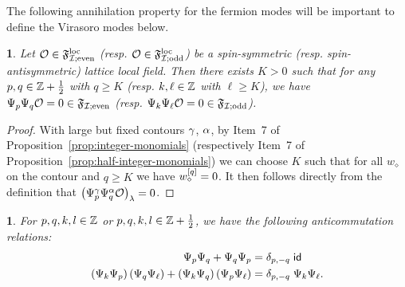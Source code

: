 \documentclass[12pt,oneside,english]{amsart}
\numberwithin{equation}{section}
\numberwithin{figure}{section}
\theoremstyle{plain}
\theoremstyle{plain}
\theoremstyle{plain}
\newtheorem{prop}[thm]{\protect\propositionname}
\theoremstyle{plain}
\newtheorem{lem}[thm]{\protect\lemmaname}
\theoremstyle{remark}
\theoremstyle{definition}
\theoremstyle{plain}
\theoremstyle{plain}
\numberwithin{thm}{section}
\providecommand{\lemmaname}{Lemma}
\providecommand{\propositionname}{Proposition}
\providecommand{\lemmaname}{Lemma}
\providecommand{\propositionname}{Proposition}
\providecommand{\lemmaname}{Lemma}
\providecommand{\propositionname}{Proposition}
\providecommand{\lemmaname}{Lemma}
\providecommand{\propositionname}{Proposition}
\begin{document}
The following annihilation property for the fermion modes will be
important to define the Virasoro modes below. 
\begin{lem}
\label{lem:bounded-energy-fermion-modes}
Let ${\mathcal{O}} \in \mathfrak{F}^\mathrm{loc}_{\mathcal{I}; \mathrm{even}}$
(resp. ${\mathcal{O}} \in \mathfrak{F}^\mathrm{loc}_{\mathcal{I}; \mathrm{odd}}$)
be a spin-symmetric (resp. spin-antisymmetric) lattice local field.
Then there exists $K>0$ such that for any
$p,q \in \mathbb{Z} + \frac{1}{2}$ with $q\geq K$
(resp. $k,\ell \in \mathbb{Z}$ with $\ell\geq K$), 
we have ${\Psi}_{p} {\Psi}_{q} {\mathcal{O}} = 0 \in \mathfrak{F}_{\mathcal{I}; \mathrm{even}}$
(resp. 
${\Psi}_{k} {\Psi}_{\ell} {\mathcal{O}} = 0 \in \mathfrak{F}_{\mathcal{I}; \mathrm{odd}}$).
\end{lem}
\begin{proof}
With large but fixed contours $\gamma$, $\alpha$,
by Item~7 of Proposition~\ref{prop:integer-monomials}
(respectively Item~7 of Proposition~\ref{prop:half-integer-monomials})
we can choose $K$ such that for all $w_{\diamond}$ on the contour and
$q \geq K$ we have ${w_{\diamond}^{[{q}]}} = 0$.
It then follows directly from the definition that 
$\big( {\Psi}^{\gamma}_{p} {\Psi}^{\alpha}_{q}
    {\mathcal{O}} \big)_{{\lambda}} = 0$.
\end{proof}
\begin{prop}
\label{prop:fermion-modes-anticommutation-relations}For $p,q,k,l\in\mathbb{Z} $
or $p,q,k,l\in\mathbb{Z} +\frac{1}{2}$, we have the following anticommutation
relations: 
\begin{align}
{\Psi}_{p}{\Psi}_{q}+{\Psi}_{q}{\Psi}_{p} & 
= \delta_{p,-q} \; \mathsf{id} 
\label{eq:first-anticommutation}\\
    \left({\Psi}_{k}{\Psi}_{p}\right) 
\left({\Psi}_{q}{\Psi}_{\ell}\right)
  + \left({\Psi}_{k}{\Psi}_{q}\right) 
\left({\Psi}_{p}{\Psi}_{\ell}\right) & 
= \delta_{p,-q} \; {\Psi}_{k}{\Psi}_{\ell} .
\label{eq:second-anticommutation}
\end{align}
\end{prop}
\end{document}
